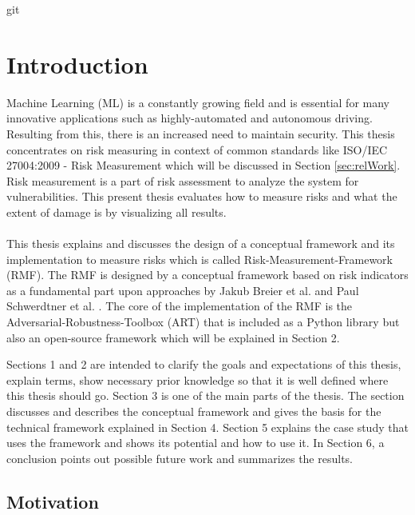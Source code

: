 git %
\section{Introduction}
\label{sec:intro}

Machine Learning (ML) is a constantly growing field and is essential for many innovative applications such as highly-automated and autonomous driving. Resulting from this,
there is an increased need to maintain security. This thesis concentrates on risk measuring in context of common standards like ISO/IEC 27004:2009 - Risk Measurement which will be
discussed in Section \ref{sec:relWork}. Risk measurement is a part of risk assessment to analyze the system for vulnerabilities. This present thesis evaluates how to measure risks and what the
extent of damage is by visualizing all results. \\ \\
This thesis explains and discusses the design of a conceptual framework and its implementation to measure risks which is called Risk-Measurement-Framework (RMF). The RMF is designed by a
conceptual framework based on risk indicators as a fundamental part upon approaches by Jakub Breier et al. \cite{DBLP:journals/corr/abs-2012-04884} and Paul Schwerdtner et al.
\cite{DBLP:journals/corr/abs-2011-04328}. The core of the implementation of the RMF is the Adversarial-Robustness-Toolbox (ART) that is included as a Python library but also an open-source
framework which will be explained in Section 2.

Sections 1 and 2 are intended to clarify the goals and expectations of this thesis, explain terms, show necessary prior knowledge so that it is well defined where this thesis should go.
Section 3 is one of the main parts of the thesis. The section discusses and describes the conceptual framework and gives the basis for the technical framework explained in Section 4.
Section 5 explains the case study that uses the framework and shows its potential and how to use it. In Section 6, a conclusion points out possible future work and summarizes the results.

\subsection{Motivation}

